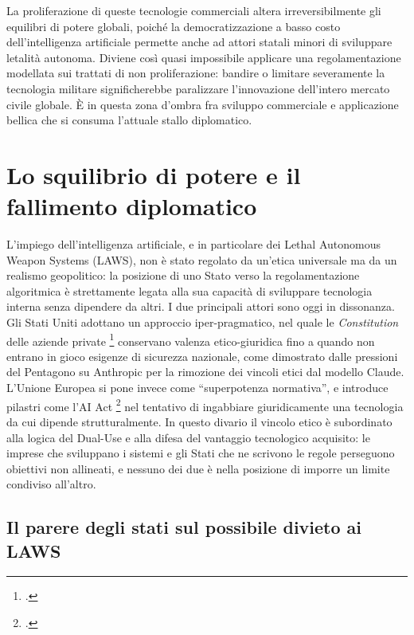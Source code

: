\documentclass[a4paper,12pt]{report}
\begin{document}
La proliferazione di queste tecnologie commerciali altera irreversibilmente gli
equilibri di potere globali, poiché la democratizzazione a basso costo
dell'intelligenza artificiale permette anche ad attori statali minori di
sviluppare letalità autonoma. Diviene così quasi
impossibile applicare una regolamentazione modellata sui trattati di non
proliferazione: bandire o limitare severamente la tecnologia militare
significherebbe paralizzare l'innovazione dell'intero mercato civile globale. È
in questa zona d'ombra fra sviluppo commerciale e applicazione bellica che si
consuma l'attuale stallo diplomatico.
 
\section{Lo squilibrio di potere e il fallimento diplomatico}
 
L'impiego dell'intelligenza artificiale, e in particolare dei Lethal Autonomous
Weapon Systems (LAWS), non è stato regolato da un'etica universale ma da un
realismo geopolitico: la posizione di uno Stato verso la regolamentazione
algoritmica è strettamente legata alla sua capacità di sviluppare tecnologia
interna senza dipendere da altri. I due principali attori sono oggi in
dissonanza. Gli Stati Uniti adottano un approccio iper-pragmatico, nel quale le
\textit{Constitution} delle aziende private \footcite{anthropic_constitution}
conservano valenza etico-giuridica fino a quando non entrano in gioco esigenze
di sicurezza nazionale, come dimostrato dalle pressioni del Pentagono su
Anthropic per la rimozione dei vincoli etici dal modello Claude. L'Unione
Europea si pone invece come ``superpotenza normativa'', e introduce pilastri
come l'AI Act \footcite{vogiatzoglou_2024_ai_act_exception} nel tentativo di ingabbiare giuridicamente
una tecnologia da cui dipende strutturalmente. In questo divario il vincolo etico è subordinato alla logica del Dual-Use e
alla difesa del vantaggio tecnologico acquisito: le imprese che sviluppano i
sistemi e gli Stati che ne scrivono le regole perseguono obiettivi non
allineati, e nessuno dei due è nella posizione di imporre un limite condiviso
all'altro.
 
\subsection{Il parere degli stati sul possibile divieto ai LAWS}
\end{document}
